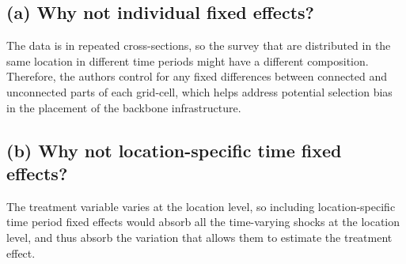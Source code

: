 \documentclass{scrartcl}
\begin{document}
\subsection*{(a) Why not individual fixed effects?}



The data is in repeated cross-sections, so the survey that are distributed in the same location in different time periods might have a different composition. Therefore, the authors control for any fixed differences between connected and unconnected parts of each grid-cell, which helps address potential selection bias in the placement of the backbone infrastructure. 


\subsection*{(b) Why not location-specific time fixed effects?}

The treatment variable varies at the location level, so including location-specific time period fixed effects would absorb all the time-varying shocks at the location level, and thus absorb the variation that allows them to estimate the treatment effect.
\end{document}
